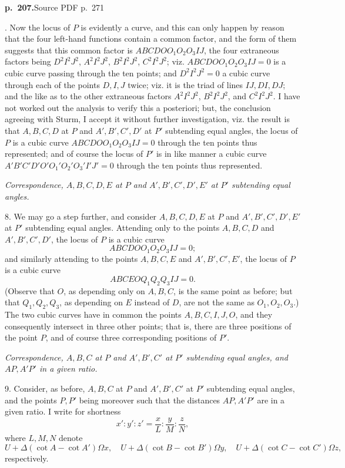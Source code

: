 \documentclass[11pt,a4paper]{article}
\newcommand{\sourcepage}[2]{\par\bigskip\noindent\textbf{p.~#1.}\hfill{\footnotesize Source PDF p.~#2}\par\nobreak\medskip}
\begin{document}
\sourcepage{207}{271}
7. Now the locus of $P$ is evidently a curve, and this can only happen by reason that the four left-hand functions contain a common factor, and the form of them suggests that this common factor is $ABCDOO_1O_2O_3IJ$, the four extraneous factors being $D^2I^2J^2$, $A^2I^2J^2$, $B^2I^2J^2$, $C^2I^2J^2$; viz. $ABCDOO_1O_2O_3IJ=0$ is a cubic curve passing through the ten points; and $D^2I^2J^2=0$ a cubic curve through each of the points $D,I,J$ twice; viz. it is the triad of lines $IJ,DI,DJ$; and the like as to the other extraneous factors $A^2I^2J^2$, $B^2I^2J^2$, and $C^2I^2J^2$. I have not worked out the analysis to verify this a posteriori; but, the conclusion agreeing with Sturm, I accept it without further investigation, viz. the result is that $A,B,C,D$ at $P$ and $A',B',C',D'$ at $P'$ subtending equal angles, the locus of $P$ is a cubic curve $ABCDOO_1O_2O_3IJ=0$ through the ten points thus represented; and of course the locus of $P'$ is in like manner a cubic curve $A'B'C'D'O'O_1'O_2'O_3'I'J'=0$ through the ten points thus represented.

\begin{center}\textit{Correspondence, $A,B,C,D,E$ at $P$ and $A',B',C',D',E'$ at $P'$ subtending equal angles.}\end{center}

8. We may go a step further, and consider $A,B,C,D,E$ at $P$ and $A',B',C',D',E'$ at $P'$ subtending equal angles. Attending only to the points $A,B,C,D$ and $A',B',C',D'$, the locus of $P$ is a cubic curve
\[
ABCDOO_1O_2O_3IJ=0;
\]
and similarly attending to the points $A,B,C,E$ and $A',B',C',E'$, the locus of $P$ is a cubic curve
\[
ABCEOQ_1Q_2Q_3IJ=0.
\]
(Observe that $O$, as depending only on $A,B,C$, is the same point as before; but that $Q_1,Q_2,Q_3$, as depending on $E$ instead of $D$, are not the same as $O_1,O_2,O_3$.) The two cubic curves have in common the points $A,B,C,I,J,O$, and they consequently intersect in three other points; that is, there are three positions of the point $P$, and of course three corresponding positions of $P'$.

\begin{center}\textit{Correspondence, $A,B,C$ at $P$ and $A',B',C'$ at $P'$ subtending equal angles, and $AP,A'P'$ in a given ratio.}\end{center}

9. Consider, as before, $A,B,C$ at $P$ and $A',B',C'$ at $P'$ subtending equal angles, and the points $P,P'$ being moreover such that the distances $AP,A'P'$ are in a given ratio. I write for shortness
\[
x':y':z'=\frac{x}{L}:\frac{y}{M}:\frac{z}{N},
\]
where $L,M,N$ denote
\[
U+\Delta(\cot A-\cot A')\Omega x,\quad
U+\Delta(\cot B-\cot B')\Omega y,\quad
U+\Delta(\cot C-\cot C')\Omega z,
\]
respectively.
\end{document}
